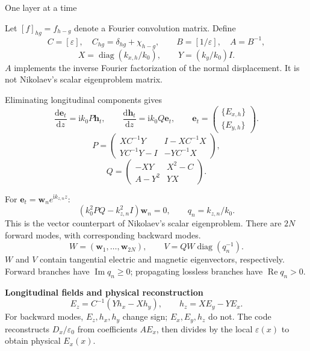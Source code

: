 \documentclass[11pt,a4paper]{article}
\newcommand{\HH}{\mathbf h}
\newcommand{\ii}{\mathrm i}
\newcommand{\dd}{\mathrm d}
\newcommand{\diag}{\operatorname{diag}}
\newcommand{\topic}[2]{\noindent{\large\bfseries #1}\hfill{\small #2}\par\medskip}
\begin{document}
\newpage
\topic{2. Vector eigenproblem}{One layer at a time}

Let $[f]_{hg}=f_{h-g}$ denote a Fourier convolution matrix. Define
\begin{equation}
 C=[\varepsilon],\quad C_{hg}=\delta_{hg}+\chi_{h-g},\qquad
 B=[1/\varepsilon],\quad A=B^{-1},
\end{equation}
\begin{equation}
 X=\diag(k_{x,h}/k_0),\qquad Y=(k_y/k_0)I.
\end{equation}
$A$ implements the inverse Fourier factorization of the normal displacement.
It is not Nikolaev's scalar eigenproblem matrix.

Eliminating longitudinal components gives
\begin{equation}
 \frac{\dd\mathbf e_t}{\dd z}=\ii k_0P\HH_t,\qquad
 \frac{\dd\HH_t}{\dd z}=\ii k_0Q\mathbf e_t,
 \qquad
 \mathbf e_t=\begin{pmatrix}\{E_{x,h}\}\\\{E_{y,h}\}\end{pmatrix}.
\end{equation}
\begin{equation}
 P=\begin{pmatrix}
 XC^{-1}Y&I-XC^{-1}X\\
 YC^{-1}Y-I&-YC^{-1}X
 \end{pmatrix},
\end{equation}
\begin{equation}
 Q=\begin{pmatrix}
 -XY&X^2-C\\
 A-Y^2&YX
 \end{pmatrix}.
\end{equation}

For $\mathbf e_t=\mathbf w_n e^{\ii k_{z,n}z}$:
\begin{equation}
 \boxed{\left(k_0^2PQ-k_{z,n}^2I\right)\mathbf w_n=0},
 \qquad q_n=k_{z,n}/k_0.
\end{equation}
This is the vector counterpart of Nikolaev's scalar eigenproblem.
There are $2N$ forward modes, with corresponding backward modes.
\begin{equation}
 W=(\mathbf w_1,\ldots,\mathbf w_{2N}),\qquad
 V=QW\diag(q_n^{-1}).
\end{equation}
$W$ and $V$ contain tangential electric and magnetic eigenvectors, respectively.
Forward branches have $\operatorname{Im}q_n\geq0$; propagating lossless branches
have $\operatorname{Re}q_n>0$.

\textbf{Longitudinal fields and physical reconstruction}
\begin{equation}
 E_z=C^{-1}(Yh_x-Xh_y),\qquad h_z=XE_y-YE_x.
\end{equation}
For backward modes, $E_z,h_x,h_y$ change sign; $E_x,E_y,h_z$ do not.
The code reconstructs $D_x/\varepsilon_0$ from coefficients $AE_x$, then divides
by the local $\varepsilon(x)$ to obtain physical $E_x(x)$.
\end{document}
